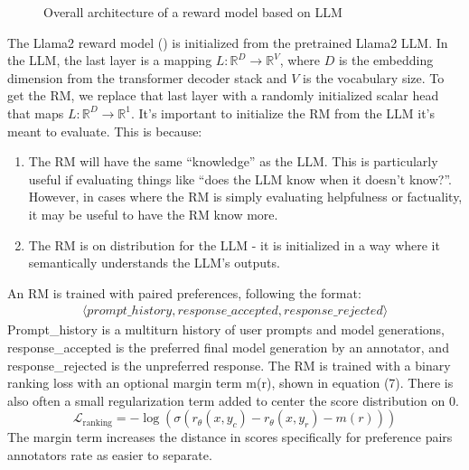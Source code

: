 \documentclass[
  letterpaper,
  numbers=noenddot,
  DIV=11,
  oneside]{scrreprt}
\theoremstyle{remark}
\begin{document}
\begin{figure}


\caption{\label{fig-rm-arch}Overall architecture of a reward model based
on LLM}

\end{figure}%

The Llama2 reward model ()
is initialized from the pretrained Llama2 LLM. In the LLM, the last
layer is a mapping \(L: \mathbb{R}^D \rightarrow \mathbb{R}^V\), where
\(D\) is the embedding dimension from the transformer decoder stack and
\(V\) is the vocabulary size. To get the RM, we replace that last layer
with a randomly initialized scalar head that maps
\(L: \mathbb{R}^D \rightarrow \mathbb{R}^1\). It's important to
initialize the RM from the LLM it's meant to evaluate. This is because:

\begin{enumerate}
\def\labelenumi{\arabic{enumi}.}
\item
  The RM will have the same ``knowledge'' as the LLM. This is
  particularly useful if evaluating things like ``does the LLM know when
  it doesn't know?''. However, in cases where the RM is simply
  evaluating helpfulness or factuality, it may be useful to have the RM
  know more.
\item
  The RM is on distribution for the LLM - it is initialized in a way
  where it semantically understands the LLM's outputs.
\end{enumerate}

An RM is trained with paired preferences, following the format:
\[\begin{aligned}
    \langle prompt\_history, response\_accepted, response\_rejected \rangle
\end{aligned}\] Prompt\_history is a multiturn history of user prompts
and model generations, response\_accepted is the preferred final model
generation by an annotator, and response\_rejected is the unpreferred
response. The RM is trained with a binary ranking loss with an optional
margin term m(r), shown in equation (7). There is also often a small
regularization term added to center the score distribution on 0.
\[\mathcal{L}_{\text{ranking}} = -\log(\sigma(r_\theta(x,y_c) - r_\theta(x,y_r) - m(r)))\]
The margin term increases the distance in scores specifically for
preference pairs annotators rate as easier to separate.
\end{document}
